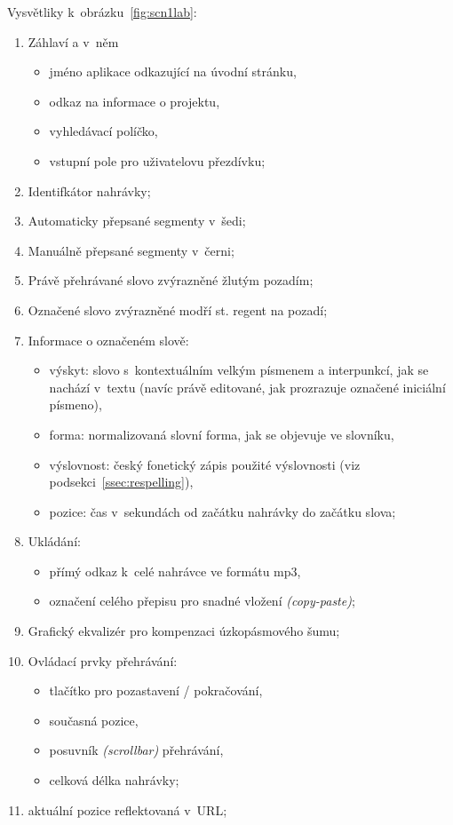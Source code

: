 Vysvětliky k~obrázku~\ref{fig:scn1lab}:
\begin{enumerate}
\item{
    Záhlaví a v~něm
    \begin{itemize}
    \item{jméno aplikace odkazující na úvodní stránku,}
    \item{odkaz na informace o projektu,}
    \item{vyhledávací políčko,}
    \item{vstupní pole pro uživatelovu přezdívku;}
    \end{itemize}
}
\item{Identifkátor nahrávky;}
\item{Automaticky přepsané segmenty v~šedi;}
\item{Manuálně přepsané segmenty v~černi;}
\item{Právě přehrávané slovo zvýrazněné žlutým pozadím;}
\item{Označené slovo zvýrazněné modří st. regent na pozadí;}
\item{
    Informace o označeném slově:
    \begin{itemize}
    \item{
        výskyt: slovo s~kontextuálním velkým písmenem a
        interpunkcí, jak se nachází v~textu
        (navíc právě editované, jak prozrazuje označené iniciální písmeno),
    }
    \item{forma: normalizovaná slovní forma, jak se objevuje ve slovníku,}
    \item{
        výslovnost: český fonetický zápis použité výslovnosti (viz
        podsekci~\ref{ssec:respelling}),
    }
    \item{
        pozice: čas v~sekundách od začátku nahrávky do začátku slova;
    }
    \end{itemize}
}
\item{
    Ukládání:
    \begin{itemize}
    \item{přímý odkaz k~celé nahrávce ve formátu mp3,}
    \item{označení celého přepisu pro snadné vložení {\em (copy-paste)};}
    \end{itemize}
}
\item{Grafický ekvalizér pro kompenzaci úzkopásmového šumu;}
\item{
    Ovládací prvky přehrávání:
    \begin{itemize}
    \item{tlačítko pro pozastavení / pokračování,}
    \item{současná pozice,}
    \item{posuvník {\em (scrollbar)} přehrávání,}
    \item{celková délka nahrávky;}
    \end{itemize}
}
\item{aktuální pozice reflektovaná v~URL;}
\end{enumerate}

